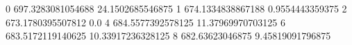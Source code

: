0 697.3283081054688 24.1502685546875
1 674.1334838867188 0.9554443359375
2 673.1780395507812 0.0
4 684.5577392578125 11.37969970703125
6 683.5172119140625 10.33917236328125
8 682.63623046875 9.45819091796875
